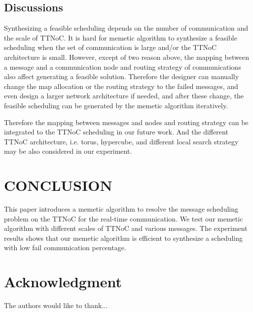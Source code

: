 \documentclass[jornal]{IEEEtran}
\begin{document}
\subsection{Discussions}

Synthesizing a feasible scheduling depends on the number of communication and the scale of TTNoC. It is hard for memetic algorithm to synthesize a feasible scheduling when the set of communication is large and/or the TTNoC architecture is small. However, except of two reason above, the mapping between a message and a communication node and routing strategy of communications also affect generating a feasible solution. Therefore the designer can manually change the map allocation or the routing strategy to the failed messages, and even design a larger network architecture if needed, and after these change, the feasible scheduling can be generated by the memetic algorithm iteratively. 

Therefore the mapping between messages and nodes and routing strategy can be integrated to the TTNoC scheduling in our future work. And the different TTNoC architecture, i.e. torus, hypercube, and different local search strategy may be also considered in our experiment.

\section{CONCLUSION\label{s:conclud}}

This paper introduces a memetic algorithm to resolve the message scheduling problem on the TTNoC for the real-time communication. We test our memetic algorithm with different scales of TTNoC and various messages. The experiment results shows that our memetic algorithm is efficient to synthesize a scheduling with low fail communication percentage.








\section*{Acknowledgment}


The authors would like to thank...





\end{document}

